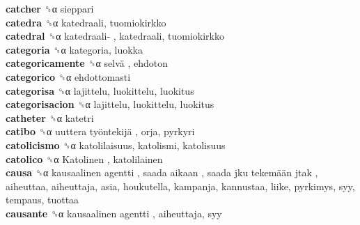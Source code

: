 \textbf{catcher} ␝α  sieppari  \\
\textbf{catedra} ␝α  katedraali, tuomiokirkko  \\
\textbf{catedral} ␝α   katedraali- , katedraali, tuomiokirkko  \\
\textbf{categoria} ␝α  kategoria, luokka  \\
\textbf{categoricamente} ␝α   selvä , ehdoton  \\
\textbf{categorico} ␝α  ehdottomasti  \\
\textbf{categorisa} ␝α  lajittelu, luokittelu, luokitus  \\
\textbf{categorisacion} ␝α  lajittelu, luokittelu, luokitus  \\
\textbf{catheter} ␝α  katetri  \\
\textbf{catibo} ␝α   uuttera työntekijä , orja, pyrkyri  \\
\textbf{catolicismo} ␝α  katolilaisuus, katolismi, katolisuus  \\
\textbf{catolico} ␝α   Katolinen , katolilainen  \\
\textbf{causa} ␝α   kausaalinen agentti ,  saada aikaan ,  saada jku tekemään jtak , aiheuttaa, aiheuttaja, asia, houkutella, kampanja, kannustaa, liike, pyrkimys, syy, tempaus, tuottaa  \\
\textbf{causante} ␝α   kausaalinen agentti , aiheuttaja, syy  \\
